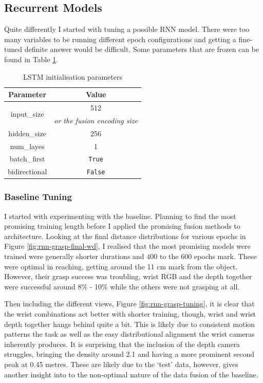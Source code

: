 \subsection{Recurrent Models}
Quite differently I started with tuning a possible RNN model. There were too many variables to be running different epoch configurations and getting a fine-tuned definite answer would be difficult. Some parameters that are frozen can be found in Table \ref{tab:rnn-params}.

\begin{table}[ht]
\centering
  \begin{tabular}{|| c | c ||}
  \hline
  Parameter & Value \\
  \hline
  \multirow{2}{*}{input\_size} & 512 \\
  & \emph{or the fusion encoding size} \\
  \hline
  hidden\_size & 256\\
  num\_layes & 1 \\
  batch\_first & \texttt{True} \\
  bidirectional & \texttt{False} \\
  \hline
  \end{tabular}\caption{LSTM initialisation parameters}\label{tab:rnn-params}
\end{table}

\subsubsection{Baseline Tuning}
I started with experimenting with the baseline. Planning to find the most promising training length before I applied the promising fusion methods to architecture. Looking at the final distance distributions for various epochs in Figure \ref{fig:rnn-grasp-final-wd}, I realised that the most promising models were trained were generally shorter durations and $400$ to the $600$ epochs mark. These were optimal in reaching, getting around the 11 cm mark from the object. However, their grasp success was troubling, wrist RGB and the depth together were successful around 8\% - 10\% while the others were not grasping at all.

Then including the different views, Figure \ref{fig:rnn-grasp-tuning}, it is clear that the wrist combinations act better with shorter training, though, wrist and wrist depth together hangs behind quite a bit. This is likely due to consistent motion patterns the task as well as the easy distributional alignment the wrist cameras inherently produces. It is surprising that the inclusion of the depth camera struggles, bringing the density around 2.1 and having a more prominent second peak at 0.45 metres. These are likely due to the `test' data, however, gives another insight into to the non-optimal nature of the data fusion of the baseline.

